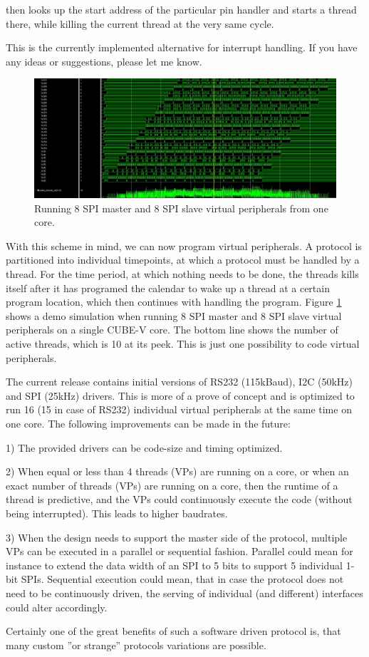 then looks up the start address of the particular pin handler and starts a thread there, while killing the current thread at the very same cycle.

This is the currently implemented alternative for interrupt handling. If you have any ideas or suggestions, please let me know.


\begin{figure}[!t]
	\centering
	\includegraphics[width=6in]{figs/spi_threads}
	\caption{Running 8 SPI master and 8 SPI slave virtual peripherals from one core.}
	\label{spi_vp}
\end{figure}

With this scheme in mind, we can now program virtual peripherals. A protocol is partitioned into individual timepoints, at which a protocol must be handled by a thread. For the time period, at which nothing needs to be done, the threads kills itself after it has programed the calendar to wake up a thread at a certain program location, which then continues with handling the program. Figure \ref{spi_vp} shows a demo simulation when running 8 SPI master and 8 SPI slave virtual peripherals on a single CUBE-V core. The bottom line shows the number of active threads, which is 10 at its peek. This is just one possibility to code virtual peripherals.

The current release contains initial versions of RS232 (115kBaud), I2C (50kHz) and SPI (25kHz) drivers. This is more of a prove of concept and is optimized to run 16 (15 in case of RS232) individual virtual peripherals at the same time on one core. The following improvements can be made in the future:

1) The provided drivers can be code-size and timing optimized. 

2) When equal or less than 4 threads (VPs) are running on a core, or when an exact number of threads (VPs) are running on a core, then the runtime of a thread is predictive, and the VPs could continuously execute the code (without being interrupted). This leads to higher baudrates.

3) When the design needs to support the master side of the protocol, multiple VPs can be executed in a parallel or sequential fashion. Parallel could mean for instance to extend the data width of an SPI to 5 bits to support 5 individual 1-bit SPIs. Sequential execution could mean, that in case the protocol does not need to be continuously driven, the serving of individual (and different) interfaces could alter accordingly.

Certainly one of the great benefits of such a software driven protocol is, that many custom ''or strange'' protocols variations are possible.
